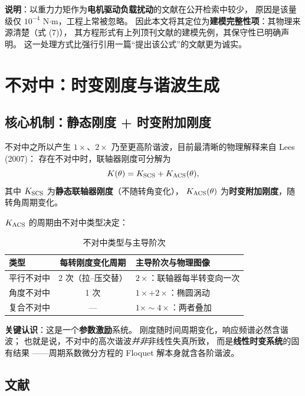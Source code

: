 \documentclass[11pt,a4paper]{ctexart}
\begin{document}
\noindent
\textbf{说明}：以重力力矩作为\textbf{电机驱动负载扰动}的文献在公开检索中较少，
原因是该量级仅 $10^{-4}$ N$\cdot$m，工程上常被忽略。
因此本文将其定位为\textbf{建模完整性项}：其物理来源清楚（式 (7)），
其方程形式有上列顶刊文献的建模先例，其保守性已明确声明。
这一处理方式比强行引用一篇“提出该公式”的文献更为诚实。

\section{不对中：时变刚度与谐波生成}
\label{sec:mis}

\subsection{核心机制：静态刚度 + 时变附加刚度}

不对中之所以产生 $1\times$、$2\times$ 乃至更高阶谐波，目前最清晰的物理解释来自 Lees (2007)：
存在不对中时，联轴器刚度可分解为
\begin{equation}
K(\theta)=K_{\rm SCS}+K_{\rm ACS}(\theta),
\end{equation}
其中 $K_{\rm SCS}$ 为\textbf{静态联轴器刚度}（不随转角变化），
$K_{\rm ACS}(\theta)$ 为\textbf{时变附加刚度}，随转角周期变化。

$K_{\rm ACS}$ 的周期由不对中类型决定：

\begin{table}[h]
\centering
\caption{不对中类型与主导阶次}
\begin{tabular}{@{}lcl@{}}
\toprule
类型 & 每转刚度变化周期 & 主导阶次与物理图像 \\
\midrule
平行不对中 & 2 次（拉--压交替） & \textbf{$2\times$}：联轴器每半转变向一次 \\
角度不对中 & 1 次 & \textbf{$1\times+2\times$}：椭圆涡动 \\
复合不对中 & — & $1\times\sim4\times$：两者叠加 \\
\bottomrule
\end{tabular}
\end{table}

\textbf{关键认识}：这是一个\textbf{参数激励}系统。
刚度随时间周期变化，响应频谱必然含谐波；
也就是说，不对中的高次谐波\emph{并非}非线性失真所致，
而是\textbf{线性时变系统}的固有结果
——周期系数微分方程的 Floquet 解本身就含各阶谐波。

\subsection{文献}
\end{document}
